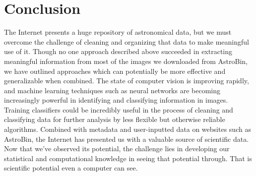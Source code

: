 \documentclass[]{article}
\begin{document}
\section*{Conclusion}
The Internet presents a huge repository of astronomical data, but we must overcome the challenge of cleaning and organizing that data to make meaningful use of it. Though no one approach described above succeeded in extracting meaningful information from most of the images we downloaded from AstroBin, we have outlined approaches which can potentially be more effective and generalizable when combined. The state of computer vision is improving rapidly, and machine learning techniques such as neural networks are becoming increasingly powerful in identifying and classifying information in images. Training classifiers could be incredibly useful in the process of cleaning and classifying data for further analysis by less flexible but otherwise reliable algorithms. Combined with metadata and user-inputted data on websites such as AstroBin, the Internet has presented us with a valuable source of scientific data. Now that we've observed its potential, the challenge lies in developing our statistical and computational knowledge in seeing that potential through. That is scientific potential even a computer can see.
\end{document}
